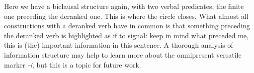 Here we have a biclausal structure again, with two verbal predicates, the finite one preceding the deranked one. This is where the circle closes. What almost all constructions with a deranked verb have in common is that something preceding the deranked verb is highlighted as if to signal: keep in mind what preceded me, this is (the) important information in this sentence. A thorough analysis of information structure may help to learn more about the omnipresent versatile marker \textit{-i}, but this is a topic for future work.

